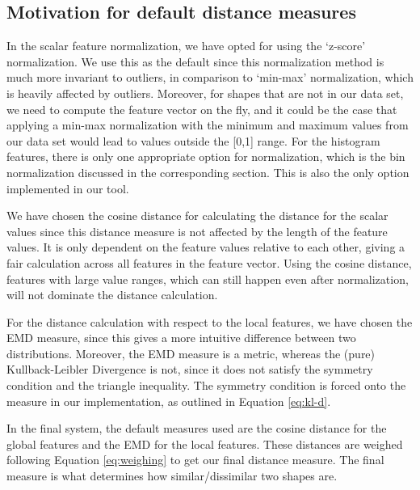 \subsection{Motivation for default distance measures}
In the scalar feature normalization, we have opted for using the `z-score' normalization.
We use this as the default since this normalization method is much more invariant to outliers, in comparison to `min-max' normalization, which is heavily affected by outliers.
Moreover, for shapes that are not in our data set, we need to compute the feature vector on the fly, and it could be the case that applying a min-max normalization with the minimum and maximum values from our data set would lead to values outside the [0,1] range.
For the histogram features, there is only one appropriate option for normalization, which is the bin normalization discussed in the corresponding section.
This is also the only option implemented in our tool.

We have chosen the cosine distance for calculating the distance for the scalar values since this distance measure is not affected by the length of the feature values.
It is only dependent on the feature values relative to each other, giving a fair calculation across all features in the feature vector.
Using the cosine distance, features with large value ranges, which can still happen even after normalization, will not dominate the distance calculation.

For the distance calculation with respect to the local features, we have chosen the EMD measure, since this gives a more intuitive difference between two distributions.
Moreover, the EMD measure is a metric, whereas the (pure) Kullback-Leibler Divergence is not, since it does not satisfy the symmetry condition and the triangle inequality.
The symmetry condition is forced onto the measure in our implementation, as outlined in Equation \ref{eq:kl-d}.

In the final system, the default measures used are the cosine distance for the global features and the EMD for the local features.
These distances are weighed following Equation \ref{eq:weighing} to get our final distance measure.
The final measure is what determines how similar/dissimilar two shapes are.


